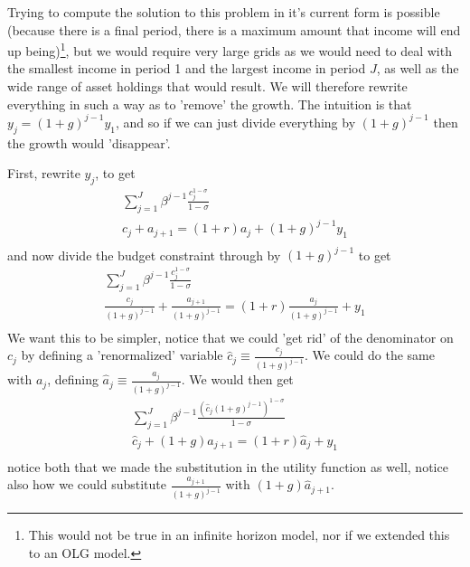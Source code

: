 Trying to compute the solution to this problem in it's current form is possible (because there is a final period, there is a maximum amount that income will end up being)\footnote{This would not be true in an infinite horizon model, nor if we extended this to an OLG model.}, but we would require very large grids as we would need to deal with the smallest income in period 1 and the largest income in period $J$, as well as the wide range of asset holdings that would result. We will therefore rewrite everything in such a way as to 'remove' the growth. The intuition is that $y_j=(1+g)^{j-1} y_1$, and so if we can just divide everything by $(1+g)^{j-1}$ then the growth would 'disappear'.

First, rewrite $y_j$, to get
\begin{eqnarray*}
    \sum_{j=1}^J \beta^{j-1} \frac{c_j^{1-\sigma}}{1-\sigma} \\
    c_j+a_{j+1}=(1+r)a_j + (1+g)^{j-1}y_1 \\
\end{eqnarray*}
and now divide the budget constraint through by $(1+g)^{j-1}$ to get
\begin{eqnarray*}
    \sum_{j=1}^J \beta^{j-1}  \frac{c_j^{1-\sigma}}{1-\sigma} \\
    \frac{c_j}{(1+g)^{j-1}}+\frac{a_{j+1}}{(1+g)^{j-1}}=(1+r)\frac{a_j}{(1+g)^{j-1}} + y_1 \\
\end{eqnarray*}
We want this to be simpler, notice that we could 'get rid' of the denominator on $c_j$ by defining a 'renormalized' variable $\hat{c}_j \equiv \frac{c_j}{(1+g)^{j-1}}$. We could do the same with $a_j$, defining $\hat{a}_j \equiv \frac{a_j}{(1+g)^{j-1}}$. We would then get
\begin{eqnarray*}
    \sum_{j=1}^J \beta^{j-1}  \frac{(\hat{c}_j (1+g)^{j-1})^{1-\sigma}}{1-\sigma} \\
    \hat{c}_j+(1+g)\hat{a}_{j+1}=(1+r)\hat{a}_j + y_1 \\
\end{eqnarray*}
notice both that we made the substitution in the utility function as well, notice also how we could substitute $\frac{a_{j+1}}{(1+g)^{j-1}}$ with $(1+g)\hat{a}_{j+1}$.

